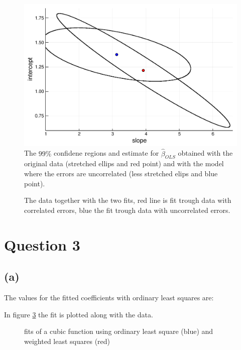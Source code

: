 \documentclass[a4paper]{article}
\begin{document}
\begin{figure}[H]
	\centering
	\includegraphics[width=.9\linewidth]{region-2.pdf}
	\caption{The $99\%$ confidene regions and estimate for $\hat{\beta}_{OLS}$ obtained with the original data (stretched ellips and red point) and with the model where the errors are uncorrelated (less stretched elips and blue point).}
	\label{fig:region-2}
\end{figure}

\begin{figure}[H]
        \centering
        
	\caption{The data together with the two fits, red line is fit trough data with correlated errors, blue the fit trough data with uncorrelated errors.}
        \label{fig:fit-3}
\end{figure}


\newpage
\section*{Question 3}

\subsection*{(a)}
\noindent {}

The values for the fitted coefficients with ordinary least squares are: 


In figure \ref{fig:fit-3} the fit is plotted along with the data. 
\begin{figure}[H]
	\centering
	
	\caption{fits of a cubic function using ordinary least square (blue) and weighted least squares (red)}
	\label{fig:fit-3}
\end{figure}
\end{document}
